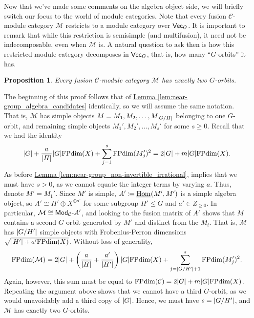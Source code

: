 \documentclass[12pt, reqno]{amsart}
\numberwithin{equation}{section}
\theoremstyle{plainspace}
\newtheorem{proposition}[theorem]{Proposition}
\theoremstyle{definitionspace}
\theoremstyle{remarkspace}
\renewenvironment{proof}{{\noindent\textbf{Proof.}}}{\null\hfill\qedsymbol}
\DeclarePairedDelimiter{\abs}{\lvert}{\rvert}
\newcommand{\mathcat}[1]{\mathcal{#1}}
\newcommand{\IntHom}[2][]{
	\ifthenelse{\equal{#2}{}}
		{\underline{\textup{Hom}}_{#1}}
		{\underline{\textup{Hom}}_{#1}\!\left(#2\right)}
}
\newcommand{\textcat}[1]{\textup{\textsf{#1}}}
\newcommand{\rmodcat}[2][]{\textcat{Mod}_{#1}\textcat{-}#2}
\newcommand{\FPdim}{\textup{FPdim}}
\begin{document}
\newline

\noindent Now that we've made some comments on the algebra object side, we will briefly switch our focus to the world of module categories. Note that every fusion $\mathcat{C}$-module category $\mathcat{M}$ restricts to a module category over $\textcat{Vec}_G$. It is important to remark that while this restriction is semisimple (and multifusion), it need not be indecomposable, even when $\mathcat{M}$ is. A natural question to ask then is how this restricted module category decomposes in $\textcat{Vec}_G$, that is, how many ``$G$-orbits'' it has.
\newline

\begin{proposition}\label{prop:near-group_algebra_orbits}
Every fusion $\mathcat{C}$-module category $\mathcat{M}$ has exactly two $G$-orbits.
\end{proposition}
\leavevmode\newline
\begin{proof}
\noindent The beginning of this proof follows that of \hyperref[lem:near-group_algebra_candidates]{Lemma \ref*{lem:near-group_algebra_candidates}} identically, so we will assume the same notation. That is, $\mathcat{M}$ has simple objects $M = M_1, M_2, \dots, M_{\abs{G/H}}$ belonging to one $G$-orbit, and remaining simple objects $M_1', M_2', \dots, M_s'$ for some $s \geq 0$. Recall that we had the identity
\begin{align*}
\begin{split}
\abs{G} + \frac{a}{\abs{H}}\abs{G}\FPdim(X) + \sum_{j=1}^{s}{\FPdim(M_j')^2} = 2\abs{G} + m\abs{G}\FPdim(X).
\end{split}
\end{align*}
\noindent As before \hyperref[lem:near-group_non-invertible_irrational]{Lemma \ref*{lem:near-group_non-invertible_irrational}}, implies that we must have $s > 0$, as we cannot equate the integer terms by varying $a$. Thus, denote $M' = M_1'$. Since $M'$ is simple, $A' \coloneqq \IntHom{M', M'}$ is a simple algebra object, so $A' \cong H' \oplus X^{\oplus a'}$ for some subgroup $H' \leq G$ and $a' \in Z_{\geq 0}$. In particular, $\mathcat{M} \cong \rmodcat[\mathcat{C}]{A'}$, and looking to the fusion matrix of $A'$ shows that $M$ contains a second $G$-orbit generated by $M'$ and distinct from the $M_i$. That is, $\mathcat{M}$ has $\abs{G/H'}$ simple objects with Frobenius-Perron dimensions $\sqrt{\abs{H'} + a'\FPdim(X)}$. Without loss of generality,
\begin{align}
\begin{split}
\label{eq:near-group_module_dimension}
\FPdim(\mathcat{M}) = 2\abs{G} + \left(\frac{a}{\abs{H}} + \frac{a'}{\abs{H'}}\right)\abs{G}\FPdim(X) + \sum_{j=\abs{G/H'}+1}^{s}{\FPdim(M_j')^2}.
\end{split}
\end{align}
\noindent Again, however, this sum must be equal to $\FPdim(\mathcat{C}) = 2\abs{G} + m\abs{G}\FPdim(X)$. Repeating the argument above shows that we cannot have a third $G$-orbit, as we would unavoidably add a third copy of $\abs{G}$. Hence, we must have $s = \abs{G/H'}$, and $\mathcat{M}$ has exactly two $G$-orbits.
\end{proof}
\end{document}
